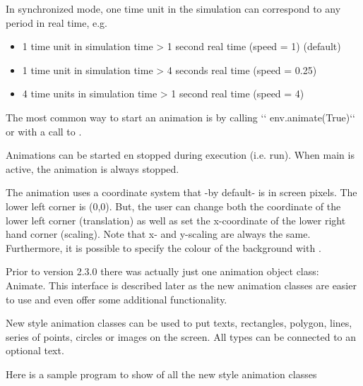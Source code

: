 \documentclass[letterpaper,10pt,english]{sphinxmanual}
\begin{document}
In synchronized mode, one time unit in the simulation can correspond to any period in real time, e.g.
\begin{itemize}
\item {} 
1 time unit in simulation time \textendash{}\textgreater{} 1 second real time (speed = 1) (default)

\item {} 
1 time unit in simulation time \textendash{}\textgreater{} 4 seconds real time (speed = 0.25)

\item {} 
4 time units in simulation time \textendash{}\textgreater{} 1 second real time (speed = 4)

\end{itemize}

The most common way to start an animation is by calling
{}`{}` env.animate(True){}`{}` or with a call to .

Animations can be started en stopped during execution (i.e. run). When main is active, the animation
is always stopped.

The animation uses a coordinate system that -by default- is in screen pixels. The lower left corner is (0,0).
But, the user can change both the coordinate of the lower left corner (translation) as well as set the x-coordinate
of the lower right hand corner (scaling). Note that x- and y-scaling are always the same. 
Furthermore, it is possible to specify the colour of the background with .

Prior to version 2.3.0 there was actually just one animation object class: Animate. This
interface is described later as the new animation classes are easier to use and even offer some
additional functionality.

New style animation classes can be used to put texts, rectangles, polygon, lines, series of points, circles
or images on the screen. All types can be connected to an optional text.

Here is a sample program to show of all the new style animation classes
\end{document}
